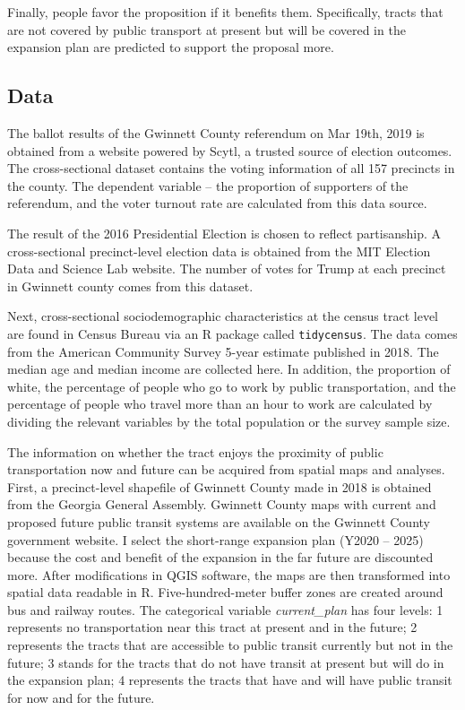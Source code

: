 \documentclass[
]{article}
\begin{document}
Finally, people favor the proposition if it benefits them. Specifically,
tracts that are not covered by public transport at present but will be
covered in the expansion plan are predicted to support the proposal
more.

\hypertarget{data}{%
\subsection{Data}\label{data}}

The ballot results of the Gwinnett County referendum on Mar 19th, 2019
is obtained from a website powered by Scytl, a trusted source of
election outcomes. The cross-sectional dataset contains the voting
information of all 157 precincts in the county. The dependent variable
-- the proportion of supporters of the referendum, and the voter turnout
rate are calculated from this data source.

The result of the 2016 Presidential Election is chosen to reflect
partisanship. A cross-sectional precinct-level election data is obtained
from the MIT Election Data and Science Lab website. The number of votes
for Trump at each precinct in Gwinnett county comes from this dataset.

Next, cross-sectional sociodemographic characteristics at the census
tract level are found in Census Bureau via an R package called
\texttt{tidycensus}. The data comes from the American Community Survey
5-year estimate published in 2018. The median age and median income are
collected here. In addition, the proportion of white, the percentage of
people who go to work by public transportation, and the percentage of
people who travel more than an hour to work are calculated by dividing
the relevant variables by the total population or the survey sample
size.

The information on whether the tract enjoys the proximity of public
transportation now and future can be acquired from spatial maps and
analyses. First, a precinct-level shapefile of Gwinnett County made in
2018 is obtained from the Georgia General Assembly. Gwinnett County maps
with current and proposed future public transit systems are available on
the Gwinnett County government website. I select the short-range
expansion plan (Y2020 -- 2025) because the cost and benefit of the
expansion in the far future are discounted more. After modifications in
QGIS software, the maps are then transformed into spatial data readable
in R. Five-hundred-meter buffer zones are created around bus and railway
routes. The categorical variable \emph{current\_plan} has four levels: 1
represents no transportation near this tract at present and in the
future; 2 represents the tracts that are accessible to public transit
currently but not in the future; 3 stands for the tracts that do not
have transit at present but will do in the expansion plan; 4 represents
the tracts that have and will have public transit for now and for the
future.
\end{document}
